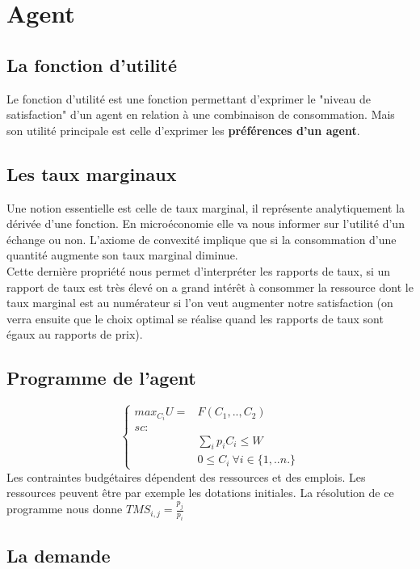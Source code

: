 \section{Agent}

\subsection{La fonction d'utilité}

Le fonction d'utilité est une fonction permettant d'exprimer le "niveau de satisfaction" d'un agent en relation à une combinaison de consommation. Mais son utilité principale est celle d'exprimer les\textbf{ préférences d'un agent}.

\subsection{Les taux marginaux}
Une notion essentielle est celle de taux marginal, il représente analytiquement la dérivée d'une fonction. En microéconomie elle va nous informer sur l'utilité d'un échange ou non. L'axiome de convexité implique que si la consommation d'une quantité augmente son taux marginal diminue. \\
Cette dernière propriété nous permet d'interpréter les rapports de taux, si un rapport de taux est très élevé on a grand intérêt à consommer la ressource dont le taux marginal est au numérateur si l'on veut augmenter notre satisfaction (on verra ensuite que le choix optimal se réalise quand les rapports de taux sont égaux au rapports de prix).

\subsection{Programme de l'agent}
$$
\left\{
\begin{array}{cc}
 max_{C_i}U= & F(C_1,..,C_2)  \\
 sc: & \\
 & \sum_i p_i C_i \leq W \\
 & 0\leq C_i \ \forall i \in \{ 1,..n .\}
\end{array} 
\right.
$$
Les contraintes budgétaires dépendent des ressources et des emplois. Les ressources peuvent être par exemple les dotations initiales.
La résolution de ce programme nous donne $TMS_{i,j}=\frac{p_j}{p_i}$

\subsection{La demande}

